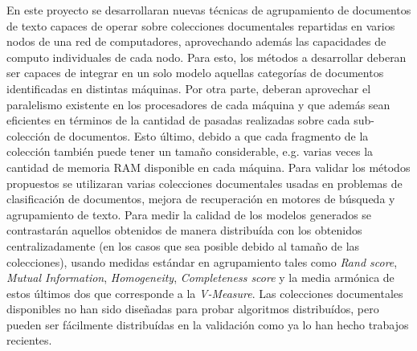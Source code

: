 \documentclass[10pt]{article}
\begin{document}
En este proyecto se desarrollaran nuevas técnicas de agrupamiento de documentos de texto capaces de operar sobre colecciones documentales repartidas en varios nodos de una red de computadores, aprovechando además las capacidades de computo individuales de cada nodo. Para esto, los métodos a desarrollar deberan ser capaces de integrar en un solo modelo aquellas categorías de documentos identificadas en distintas máquinas. Por otra parte, deberan aprovechar el paralelismo existente en los procesadores de cada máquina y que además sean eficientes en términos de la cantidad de pasadas realizadas sobre cada sub-colección de documentos. Esto último, debido a que cada fragmento de la colección también puede tener un tamaño considerable, e.g. varias veces la cantidad de memoria RAM disponible en cada máquina.
Para validar los métodos propuestos se utilizaran varias colecciones documentales usadas en problemas de clasificación de documentos, mejora de recuperación en motores de búsqueda y agrupamiento de texto. Para medir la calidad de los modelos generados se contrastarán aquellos obtenidos de manera distribuída con los obtenidos centralizadamente (en los casos que sea posible debido al tamaño de las colecciones), usando medidas estándar en agrupamiento tales como \textit{Rand score}, \textit{Mutual Information}, \textit{Homogeneity}, \textit{Completeness score} y la media armónica de estos últimos dos que corresponde a la \textit{V-Measure}. Las colecciones documentales disponibles no han sido diseñadas para probar algoritmos distribuídos, pero pueden ser fácilmente distribuídas en la validación como ya lo han hecho trabajos recientes.%



%
% 
\end{document}
